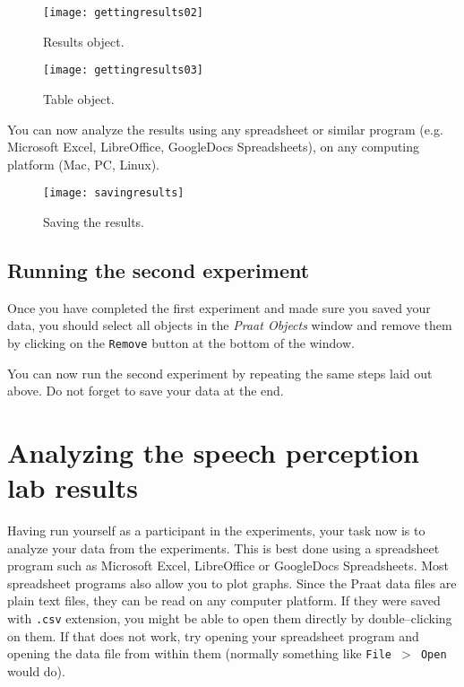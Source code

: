 \documentclass{article}
\newcommand{\soft}[1]{\textsf{#1}}
\newcommand{\filefmat}[1]{\texttt{#1}}
\newcommand{\softmenu}[1]{\texttt{#1}}
\newcommand{\MSExcel}{\soft{Microsoft\texttrademark{} Excel}}
\newcommand{\OpOff}{\soft{LibreOffice}}
\newcommand{\GDocs}{\soft{GoogleDocs Spreadsheets}}
\newcommand{\Praat}{\soft{Praat}}
\begin{document}
\begin{figure}[!tbp]
\caption{Results object.}
\label{gettingresults02}
	\begin{center}
		\texttt{[image: gettingresults02]}
	\end{center}
\end{figure}

\begin{figure}[!tbp]
\caption{Table object.}
\label{gettingresults03}
	\begin{center}
		\texttt{[image: gettingresults03]}
	\end{center}
\end{figure}

You can now analyze the results using any spreadsheet or similar program (e.g. \MSExcel{}, \OpOff{}, \GDocs{}), on any computing platform (Mac, PC, Linux). 

\begin{figure}[!tbp]
\caption{Saving the results.}
\label{savingresults}
	\begin{center}
		\texttt{[image: savingresults]}
	\end{center}
\end{figure}

\subsection{Running the second experiment}

Once you have completed the first experiment and made sure you saved your data, you should select all objects in the \emph{\Praat{} Objects} window and remove them by clicking on the \softmenu{Remove} button at the bottom of the window.

You can now run the second experiment by repeating the same steps laid out above. Do not forget to save your data at the end.

\section{Analyzing the speech perception lab results}

Having run yourself as a participant in the experiments, your task now is to analyze your data from the experiments. This is best done using a spreadsheet program such as \MSExcel{}, \OpOff{} or \GDocs{}. Most spreadsheet programs also allow you to plot graphs. Since the \Praat{} data files are plain text files, they can be read on any computer platform. If they were saved with \filefmat{.csv} extension, you might be able to open them directly by double--clicking on them. If that does not work, try opening your spreadsheet program and opening the data file from within them (normally something like \softmenu{File $>$ Open} would do).
\end{document}
